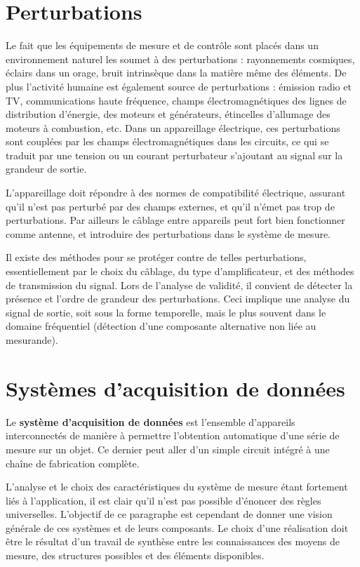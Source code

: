 \section{Perturbations}

Le fait que les équipements de mesure et de contrôle sont placés dans un environnement naturel les soumet à des perturbations : rayonnements cosmiques, éclairs dans un orage, bruit intrinsèque dans la matière même des éléments. De plus l'activité humaine est également source de perturbations : émission radio et TV, communications haute fréquence, champs électromagnétiques des lignes de distribution d'énergie, des moteurs et générateurs, étincelles d'allumage des moteurs à combustion, etc. Dans un appareillage électrique, ces perturbations sont couplées par les champs électromagnétiques dans les circuits, ce qui se traduit par une tension ou un courant perturbateur s'ajoutant au signal sur la grandeur de sortie.

L'appareillage doit répondre à des normes de compatibilité électrique, assurant qu'il n'est pas perturbé par des champs externes, et qu'il n'émet pas trop de perturbations. Par ailleurs le câblage entre appareils peut fort bien fonctionner comme antenne, et introduire des perturbations dans le système de mesure.

Il existe des méthodes pour se protéger contre de telles perturbations, essentiellement par le choix du câblage, du type d'amplificateur, et des méthodes de transmission du signal. Lors de l'analyse de validité, il convient de détecter la présence et l'ordre de grandeur des perturbations. Ceci implique une analyse du signal de sortie, soit sous la forme temporelle, mais le plus souvent dans le domaine fréquentiel (détection d'une composante alternative non liée au mesurande).

\section{Systèmes d'acquisition de données}

\begin{definition}
    Le \textbf{système d'acquisition de données} est l'ensemble d'appareils interconnectés de manière à permettre l'obtention automatique d'une série de mesure sur un objet. Ce dernier peut aller d'un simple circuit intégré à une chaîne de fabrication complète.
\end{definition}

L'analyse et le choix des caractéristiques du système de mesure étant fortement liés à l'application, il est clair qu'il n'est pas possible d'énoncer des règles universelles. L'objectif de ce paragraphe est cependant de donner une vision générale de ces systèmes et de leurs composants. Le choix d'une réalisation doit être le résultat d'un travail de synthèse entre les connaissances des moyens de mesure, des structures possibles et des éléments disponibles.

